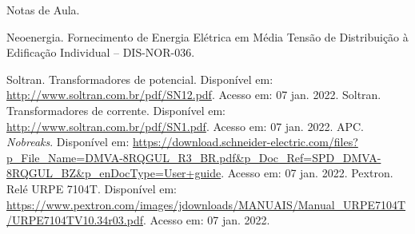\newpage

\begin{thebibliography}
\raggedright
{} Notas de Aula.

 Neoenergia. Fornecimento de Energia Elétrica em Média Tensão de Distribuição à Edificação Individual – DIS-NOR-036.

 Soltran. Transformadores de potencial. Disponível em:  \url{http://www.soltran.com.br/pdf/SN12.pdf}. Acesso em: 07 jan. 2022.
 Soltran. Transformadores de corrente. Disponível em:  \url{http://www.soltran.com.br/pdf/SN1.pdf}. Acesso em: 07 jan. 2022.
 APC. \textit{Nobreaks}. Disponível em:  \url{https://download.schneider-electric.com/files?p_File_Name=DMVA-8RQGUL_R3_BR.pdf&p_Doc_Ref=SPD_DMVA-8RQGUL_BZ&p_enDocType=User+guide}. Acesso em: 07 jan. 2022.
 Pextron. Relé URPE 7104T. Disponível em:  \url{https://www.pextron.com/images/jdownloads/MANUAIS/Manual_URPE7104T/URPE7104TV10.34r03.pdf}. Acesso em: 07 jan. 2022.
\end{thebibliography}

\newpage